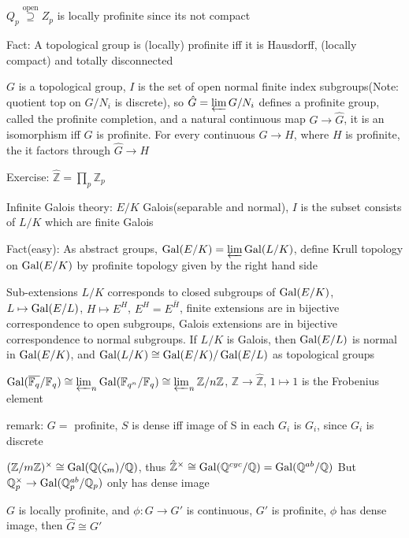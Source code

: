\documentclass[main]{subfiles}
\begin{document}
\begin{example}
$Q_p\overset{\text{open}}{\supseteq} Z_p$ is locally profinite since its not compact
\end{example}

Fact: A topological group is (locally) profinite iff it is Hausdorff, (locally compact) and totally disconnected

$G$ is a topological group, $I$ is the set of open normal finite index subgroups(Note: quotient top on $G/N_i$ is discrete), so $\hat G=\varprojlim G/N_i$ defines a profinite group, called the profinite completion, and a natural continuous map $G\to\hat G$, it is an isomorphism iff $G$ is profinite. For every continuous $G\to H$, where $H$ is profinite, the it factors through $\hat G\to H$

Exercise: $\hat{\mathbb Z}=\prod_p\mathbb Z_p$

Infinite Galois theory: $E/K$ Galois(separable and normal), $I$ is the subset consists of $L/K$ which are finite Galois

Fact(easy): As abstract groups, $\operatorname{Gal}(E/K)=\varprojlim\operatorname{Gal}(L/K)$, define Krull topology on $\operatorname{Gal}(E/K)$ by profinite topology given by the right hand side

\begin{theorem}
Sub-extensions $L/K$ corresponds to closed subgroups of $\operatorname{Gal}(E/K)$, $L\mapsto\operatorname{Gal}(E/L)$, $H\mapsto E^H$, $E^H=E^{\bar H}$, finite extensions are in bijective correspondence to open subgroups, Galois extensions are in bijective correspondence to normal subgroups. If $L/K$ is Galois, then $\operatorname{Gal}(E/L)$ is normal in $\operatorname{Gal}(E/K)$, and $\operatorname{Gal}(L/K)\cong\operatorname{Gal}(E/K)/\operatorname{Gal}(E/L)$ as topological groups
\end{theorem}

\begin{example}
$\operatorname{Gal}(\overline{\mathbb F_q}/\mathbb F_q)\cong\varprojlim_n\operatorname{Gal}(\mathbb F_{q^n}/\mathbb F_q)\cong\varprojlim_n\mathbb Z/n\mathbb Z$, $\mathbb Z\to\hat{\mathbb Z}$, $1\mapsto 1$ is the Frobenius element
\end{example}

remark: $G=$ profinite, $S$ is dense iff image of S in each $G_i$ is $G_i$, since $G_i$ is discrete

$(\mathbb Z/m\mathbb Z)^\times\cong\operatorname{Gal}(\mathbb Q(\zeta_m)/\mathbb Q)$, thus $\hat{\mathbb Z}^\times\cong\operatorname{Gal}(\mathbb Q^{cyc}/\mathbb Q)=\operatorname{Gal}(\mathbb Q^{ab}/\mathbb Q)$
But $\mathbb Q_p^\times\to\operatorname{Gal}(\mathbb Q_p^{ab}/\mathbb Q_p)$ only has dense image

\begin{exercise}
$G$ is locally profinite, and $\phi:G\to G'$ is continuous, $G'$ is profinite, $\phi$ has dense image, then $\hat G\cong G'$
\end{exercise}
\end{document}
